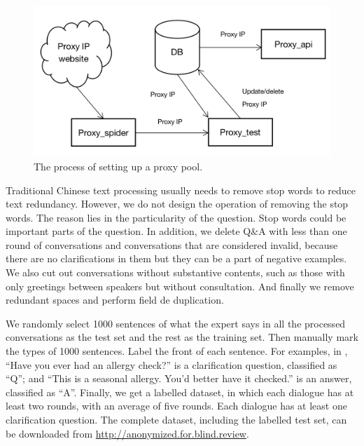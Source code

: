\begin{figure}[th]
\centering
\includegraphics[scale=0.35]{1.png}
\caption{The process of setting up a proxy pool.}
\label{fig:figure2}
\end{figure}

Traditional Chinese text processing usually needs to remove stop words to reduce text redundancy. However, we do not design the operation of removing the stop words. The reason lies in the particularity of the question. Stop words could be important parts of the question. In addition, we delete Q$\&$A with less than one round of conversations and conversations that are considered invalid, because there are no clarifications in them but they can be a part of negative examples.
We also cut out conversations without substantive contents, such as those with only greetings between speakers but without consultation. And finally we remove redundant spaces and perform field de duplication.

We randomly select 1000 sentences of what the expert says in all the processed conversations as the test set and the rest as the training set. Then manually mark the types of 1000 sentences. Label the front of each sentence. For examples, in , ``Have you ever had an allergy check?'' is a clarification question, classified as ``Q''; and ``This is a seasonal allergy. You'd better have it checked.'' is an answer, classified as ``A''. Finally, we get a labelled dataset, in which each dialogue has at least two rounds, with an average of five rounds. Each dialogue has at least one clarification question.
The complete dataset, including the labelled test set, can be downloaded from \url{http://anonymized.for.blind.review}.
